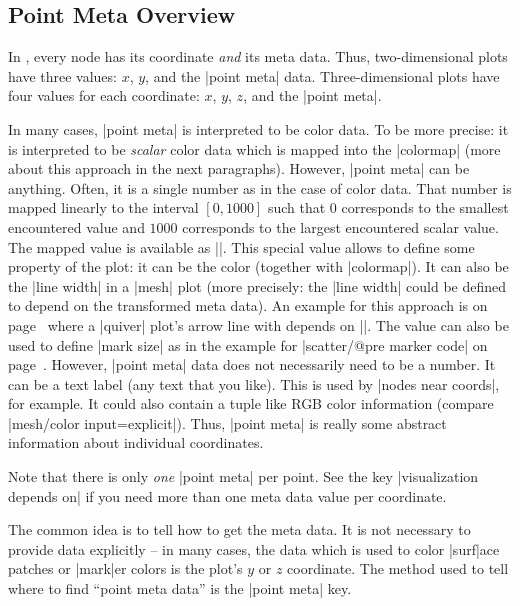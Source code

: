 \subsection{Point Meta Overview}

In \PGFPlots{}, every node has its coordinate \emph{and} its meta data. Thus,
two-dimensional plots have three values: $x$, $y$, and the |point meta| data.
Three-dimensional plots have four values for each coordinate: $x$, $y$, $z$,
and the |point meta|.

In many cases, |point meta| is interpreted to be color data. To be more
precise: it is interpreted to be \emph{scalar} color data which is mapped into
the |colormap| (more about this approach in the next paragraphs). However,
|point meta| can be anything. Often, it is a single number as in the case of
color data. That number is mapped linearly to the interval $[0,1000]$ such that
$0$ corresponds to the smallest encountered value and $1000$ corresponds to the
largest encountered scalar value. The mapped value is available as
|\pgfplotspointmetatransformed|. This special value allows to define some
property of the plot: it can be the color (together with |colormap|). It can
also be the |line width| in a |mesh| plot (more precisely: the |line width|
could be defined to depend on the transformed meta data). An example for this
approach is on page~\pageref{pgfplots:example:pointmeta:quiver} where a
|quiver| plot's arrow line with depends on |\pgfplotspointmetatransformed|. The
value can also be used to define |mark size| as in the example for
|scatter/@pre marker code| on
page~\pageref{pgfplots:example:pointmeta:scatter}. However, |point meta| data
does not necessarily need to be a number. It can be a text label (any text that
you like). This is used by |nodes near coords|, for example. It could also
contain a tuple like RGB color information (compare
|mesh/color input=explicit|). Thus, |point meta| is really some abstract
information about individual coordinates.

Note that there is only \emph{one} |point meta| per point. See the key
|visualization depends on| if you need more than one meta data value per
coordinate.

The common idea is to tell \PGFPlots{} how to get the meta data. It is not
necessary to provide data explicitly -- in many cases, the data which is used
to color |surf|ace patches or |mark|er colors is the plot's $y$ or $z$
coordinate. The method used to tell \PGFPlots{} where to find ``point meta
data'' is the |point meta| key.

